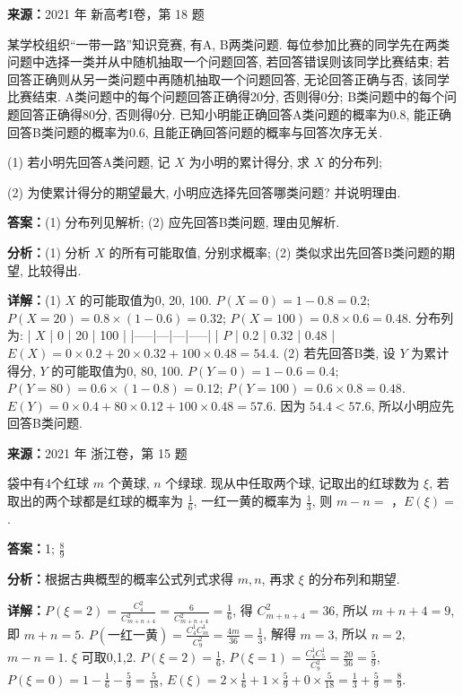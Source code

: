 \begin{question}[points=12]
\textbf{来源：}2021 年 新高考I卷，第 18 题\par
某学校组织“一带一路”知识竞赛, 有A, B两类问题. 每位参加比赛的同学先在两类问题中选择一类并从中随机抽取一个问题回答, 若回答错误则该同学比赛结束; 若回答正确则从另一类问题中再随机抽取一个问题回答, 无论回答正确与否, 该同学比赛结束. A类问题中的每个问题回答正确得20分, 否则得0分; B类问题中的每个问题回答正确得80分, 否则得0分. 已知小明能正确回答A类问题的概率为0.8, 能正确回答B类问题的概率为0.6, 且能正确回答问题的概率与回答次序无关.

(1) 若小明先回答A类问题, 记 $X$ 为小明的累计得分, 求 $X$ 的分布列;

(2) 为使累计得分的期望最大, 小明应选择先回答哪类问题? 并说明理由.
\begin{solution}
\textbf{答案：}(1) 分布列见解析; (2) 应先回答B类问题, 理由见解析.

\textbf{分析：}(1) 分析 $X$ 的所有可能取值, 分别求概率; (2) 类似求出先回答B类问题的期望, 比较得出.

\textbf{详解：}(1) $X$ 的可能取值为0, 20, 100. $P(X=0) = 1-0.8 = 0.2$; $P(X=20) = 0.8 \times (1-0.6) = 0.32$; $P(X=100) = 0.8 \times 0.6 = 0.48$. 分布列为:
| $X$ | 0 | 20 | 100 |
|-----|---|---|-----|
| $P$ | 0.2 | 0.32 | 0.48 |
$E(X) = 0\times0.2 + 20\times0.32 + 100\times0.48 = 54.4$.
(2) 若先回答B类, 设 $Y$ 为累计得分, $Y$ 的可能取值为0, 80, 100. $P(Y=0) = 1-0.6 = 0.4$; $P(Y=80) = 0.6\times(1-0.8) = 0.12$; $P(Y=100) = 0.6\times0.8 = 0.48$. $E(Y) = 0\times0.4 + 80\times0.12 + 100\times0.48 = 57.6$. 因为 $54.4 < 57.6$, 所以小明应先回答B类问题.
\end{solution}
\end{question}

\begin{question}[points=6]
\textbf{来源：}2021 年 浙江卷，第 15 题\par
袋中有4个红球 $m$ 个黄球, $n$ 个绿球. 现从中任取两个球, 记取出的红球数为 $\xi$, 若取出的两个球都是红球的概率为 $\frac{1}{6}$, 一红一黄的概率为 $\frac{1}{3}$, 则 $m-n=$ ，$E(\xi)=$ .
\fillin[{1; $\frac{8}{9}$}]
\begin{solution}
\textbf{答案：}1; $\frac{8}{9}$

\textbf{分析：}根据古典概型的概率公式列式求得 $m,n$, 再求 $\xi$ 的分布列和期望.

\textbf{详解：}$P(\xi=2)=\frac{C_4^2}{C_{m+n+4}^2}=\frac{6}{C_{m+n+4}^2}=\frac16$, 得 $C_{m+n+4}^2=36$, 所以 $m+n+4=9$, 即 $m+n=5$. $P(\text{一红一黄})=\frac{C_4^1 C_m^1}{C_9^2}=\frac{4m}{36}=\frac13$, 解得 $m=3$, 所以 $n=2$, $m-n=1$. $\xi$ 可取0,1,2. $P(\xi=2)=\frac16$, $P(\xi=1)=\frac{C_4^1 C_5^1}{C_9^2}=\frac{20}{36}=\frac59$, $P(\xi=0)=1-\frac16-\frac59=\frac{5}{18}$, $E(\xi)=2\times\frac16+1\times\frac59+0\times\frac{5}{18}=\frac13+\frac59=\frac89$.
\end{solution}
\end{question}

